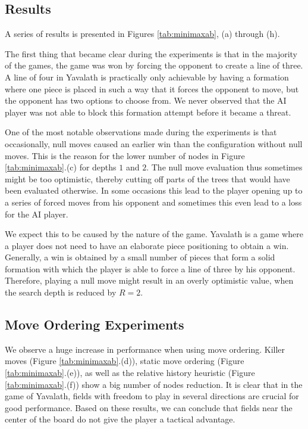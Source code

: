 \documentclass[11pt]{article}
\begin{document}
\subsection{Results}
\label{-subsec:results}

A series of results is presented in Figures \ref{tab:minimaxab}, (a) through (h).



The first thing that became clear during the experiments is that in the majority of the games, the game was won by forcing the opponent to create a line of three. A line of four in Yavalath is practically only achievable by having a formation where one piece is placed in such a way that it forces the opponent to move, but the opponent has two options to choose from. We never observed that the AI player was not able to block this formation attempt before it became a threat.

One of the most notable observations made during the experiments is that occasionally, null moves caused an earlier win than the configuration without null moves. This is the reason for the lower number of nodes in Figure \ref{tab:minimaxab}.(c) for depths $1$ and $2$. The null move evaluation thus sometimes might be too optimistic, thereby cutting off parts of the trees that would have been evaluated otherwise. In some occasions this lead to the player opening up to a series of forced moves from his opponent and sometimes this even lead to a loss for the AI player.

We expect this to be caused by the nature of the game. Yavalath is a game where a player does not need to have an elaborate piece positioning to obtain a win. Generally, a win is obtained by a small number of pieces that form a solid formation with which the player is able to force a line of three by his opponent. Therefore, playing a null move might result in an overly optimistic value, when the search depth is reduced by $R=2$.

\subsection{Move Ordering Experiments}
\label{-subsec:moveorderingexperiments}
We observe a huge increase in performance when using move ordering. Killer moves (Figure \ref{tab:minimaxab}.(d)), static move ordering (Figure \ref{tab:minimaxab}.(e)), as well as the relative history heuristic (Figure \ref{tab:minimaxab}.(f)) show a big number of nodes reduction. It is clear that in the game of Yavalath, fields with freedom to play in several directions are crucial for good performance. Based on these results, we can conclude that fields near the center of the board do not give the player a tactical advantage. 
\end{document}
